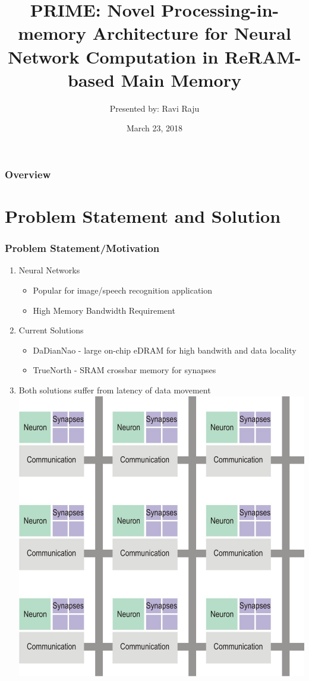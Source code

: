 \documentclass[hyperref={colorlinks}]{beamer}
\title[QII Presentation]{PRIME: Novel Processing-in-memory Architecture for Neural Network Computation in ReRAM-based Main Memory} %
\author{Presented by: Ravi Raju}
\institute[UW-Madison]{QII Presentation Spring 2018}
\date{March 23, 2018}
\begin{document}
\begin{frame}
	\titlepage
\end{frame}

\begin{frame}
	\frametitle{Overview}
	\tableofcontents
\end{frame}


\section{Problem Statement and Solution}
\begin{frame}
	\frametitle{Problem Statement/Motivation}
	\begin{enumerate}
		\item Neural Networks 
		\begin{itemize}
			\item Popular for image/speech recognition application
			\item High Memory Bandwidth Requirement
		\end{itemize}
		\item Current Solutions
		\begin{itemize}
			\item DaDianNao - large on-chip eDRAM for high bandwith and data locality
			\item TrueNorth - SRAM crossbar memory for synapses
		\end{itemize}
		\item Both solutions suffer from latency of data movement
		\includegraphics[scale=0.4, center]{ibm_sram_crossbar.jpg}
	\end{enumerate}
\end{frame}
\end{document}
